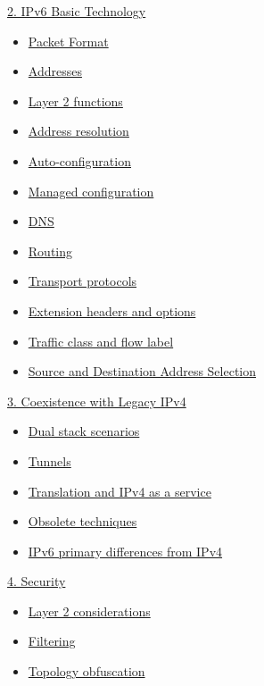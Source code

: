\documentclass[
]{article}
\providecommand{\tightlist}{%
  \setlength{\itemsep}{0pt}\setlength{\parskip}{0pt}}
\begin{document}
\hyperref[ipv6-basic-technology]{2. IPv6 Basic Technology}

\begin{itemize}
\tightlist
\item
  \hyperref[packet-format]{Packet Format}
\item
  \hyperref[addresses]{Addresses}
\item
  \hyperref[layer-2-functions]{Layer 2 functions}
\item
  \hyperref[address-resolution]{Address resolution}
\item
  \hyperref[auto-configuration]{Auto-configuration}
\item
  \hyperref[managed-configuration]{Managed configuration}
\item
  \hyperref[dns]{DNS}
\item
  \hyperref[routing]{Routing}
\item
  \hyperref[transport-protocols]{Transport protocols}
\item
  \hyperref[extension-headers-and-options]{Extension headers and
  options}
\item
  \hyperref[traffic-class-and-flow-label]{Traffic class and flow label}
\item
  \hyperref[source-and-destination-address-selection]{Source and
  Destination Address Selection}
\end{itemize}

\hyperref[coexistence-with-legacy-ipv4]{3. Coexistence with Legacy IPv4}

\begin{itemize}
\tightlist
\item
  \hyperref[dual-stack-scenarios]{Dual stack scenarios}
\item
  \hyperref[tunnels]{Tunnels}
\item
  \hyperref[translation-and-ipv4-as-a-service]{Translation and IPv4 as a
  service}
\item
  \hyperref[obsolete-techniques]{Obsolete techniques}
\item
  \hyperref[ipv6-primary-differences-from-ipv4]{IPv6 primary differences
  from IPv4}
\end{itemize}

\hyperref[security]{4. Security}

\begin{itemize}
\tightlist
\item
  \hyperref[layer-2-considerations]{Layer 2 considerations}
\item
  \hyperref[filtering]{Filtering}
\item
  \hyperref[topology-obfuscation]{Topology obfuscation}
\end{itemize}
\end{document}
